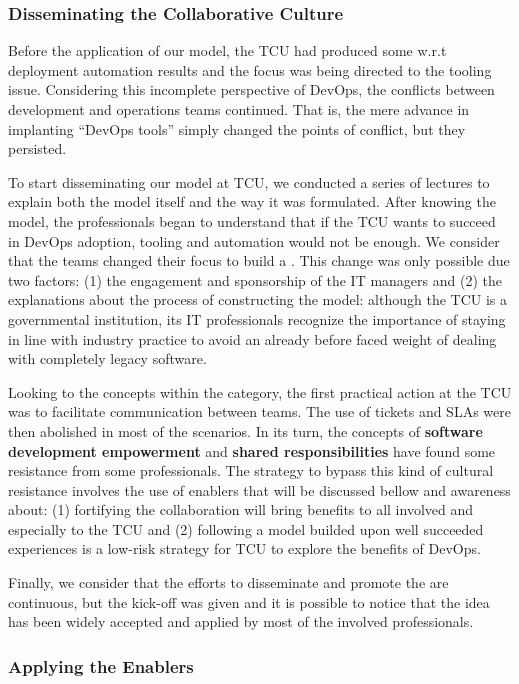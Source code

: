 \subsubsection{Disseminating the Collaborative Culture}

Before the application of our model, the TCU had produced some w.r.t deployment
automation results and the focus was being directed to the tooling issue.
Considering this incomplete perspective of DevOps, the conflicts between
development and operations teams continued. That is, the mere advance in
implanting ``DevOps tools'' simply changed the points of conflict, but they
persisted.

{
\color{blue}
To start disseminating our model at TCU, we conducted a series of lectures to
explain both the model itself and the way it was formulated. After knowing the
model, the professionals began to understand that if the TCU wants to succeed in
DevOps adoption, tooling and automation would not be enough. We consider that
the teams changed their focus to build a \cc. This change was only possible due
two factors: (1) the engagement and sponsorship of the IT managers and (2) the
explanations about the process of constructing the model: although the TCU is a
governmental institution, its IT professionals recognize the importance of
staying in line with industry practice to avoid an already before faced weight
of dealing with completely legacy software.

Looking to the concepts within the \cc category, the first practical action at
the TCU was to facilitate communication between teams. The use of tickets and
SLAs were then abolished in most of the scenarios. In its turn, the concepts of
\textbf{software development empowerment} and \textbf{shared responsibilities}
have found some resistance from some professionals. The strategy to bypass this
kind of cultural resistance involves the use of enablers that will be discussed
bellow and awareness about: (1) fortifying the collaboration will bring benefits
to all involved and especially to the TCU and (2) following a model builded upon
well succeeded experiences is a low-risk strategy for TCU to explore the
benefits of DevOps.

Finally, we consider that the efforts to disseminate and promote the \cc are
continuous, but the kick-off was given and it is possible to notice that the
idea has been widely accepted and applied by most of the involved professionals.

}

\subsubsection{Applying the Enablers}

